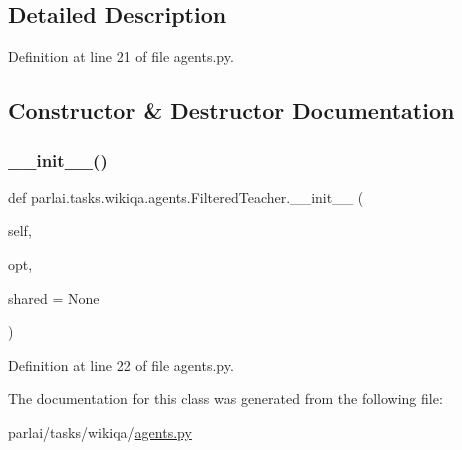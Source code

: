 \subsection{Detailed Description}


Definition at line 21 of file agents.\+py.



\subsection{Constructor \& Destructor Documentation}
\mbox{\label{classparlai_1_1tasks_1_1wikiqa_1_1agents_1_1FilteredTeacher_a35563cba37e255a02ee062216736c690}} 
\subsubsection{\texorpdfstring{\+\_\+\+\_\+init\+\_\+\+\_\+()}{\_\_init\_\_()}}
{\footnotesize\ttfamily def parlai.\+tasks.\+wikiqa.\+agents.\+Filtered\+Teacher.\+\_\+\+\_\+init\+\_\+\+\_\+ (\begin{DoxyParamCaption}\item[{}]{self,  }\item[{}]{opt,  }\item[{}]{shared = {\ttfamily None} }\end{DoxyParamCaption})}



Definition at line 22 of file agents.\+py.



The documentation for this class was generated from the following file\+:\begin{DoxyCompactItemize}
\item 
parlai/tasks/wikiqa/\hyperlink{parlai_2tasks_2wikiqa_2agents_8py}{agents.\+py}\end{DoxyCompactItemize}

